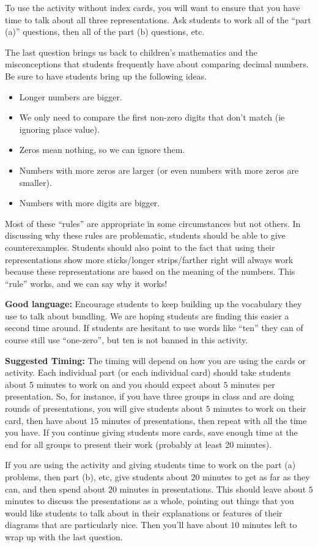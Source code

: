 \documentclass{ximera}
\begin{document}
\begin{instructorNotes}
To use the activity without index cards, you will want to ensure that you have time to talk about all three representations. Ask students to work all of the ``part (a)'' questions, then all of the part (b) questions, etc.

The last question brings us back to children's mathematics and the misconceptions that students frequently have about comparing decimal numbers. Be sure to have students bring up the following ideas.
\begin{itemize}
	\item Longer numbers are bigger.
	\item We only need to compare the first non-zero digits that don't match (ie ignoring place value).
	\item Zeros mean nothing, so we can ignore them.
	\item Numbers with more zeros are larger (or even numbers with more zeros are smaller).
	\item Numbers with more digits are bigger.
\end{itemize}
Most of these ``rules'' are appropriate in some circumstances but not others. In discussing why these rules are problematic, students should be able to give counterexamples. Students should also point to the fact that using their representations show more sticks/longer strips/farther right will always work because these representations are based on the meaning of the numbers. This ``rule'' works, and we can say why it works!

{\bf Good language:} Encourage students to keep building up the vocabulary they use to talk about bundling. We are hoping students are finding this easier a second time around. If students are hesitant to use words like ``ten'' they can of course still use ``one-zero'', but ten is not banned in this activity.

{\bf Suggested Timing:} The timing will depend on how you are using the cards or activity. Each individual part (or each individual card) should take students about 5 minutes to work on and you should expect about $5$ minutes per presentation. So, for instance, if you have three groups in class and are doing rounds of presentations, you will give students about $5$ minutes to work on their card, then have about $15$ minutes of presentations, then repeat with all the time you have. If you continue giving students more cards, save enough time at the end for all groups to present their work (probably at least 20 minutes).

If you are using the activity and giving students time to work on the part (a) problems, then part (b), etc, give students about $20$ minutes to get as far as they can, and then spend about $20$ minutes in presentations. This should leave about $5$ minutes to discuss the presentations as a whole, pointing out things that you would like students to talk about in their explanations or features of their diagrams that are particularly nice. Then you'll have about $10$ minutes left to wrap up with the last question.


\end{instructorNotes}
\end{document}
